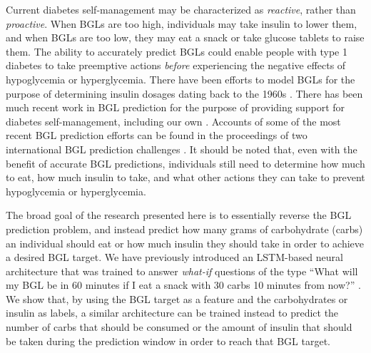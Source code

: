 \documentclass[graybox]{svmult}
\begin{document}
Current diabetes self-management may be characterized as \emph{reactive}, rather than \emph{proactive}.  When BGLs are too high, individuals may take insulin to lower them, and when BGLs are too low, they may eat a snack or take glucose tablets to raise them.  The ability to accurately predict BGLs could enable people with type 1 diabetes to take preemptive actions \emph{before} experiencing the negative effects of hypoglycemia or hyperglycemia.  There have been efforts to model BGLs for the purpose of determining insulin dosages dating back to the 1960s \cite{boutayeb2016}.  There has been much recent work in BGL prediction for the purpose of providing support for diabetes self-management, including our own \cite{bunescu:icmla13,plis:maiha14}.  Accounts of some of the most recent BGL prediction efforts can be found in the proceedings of two international BGL prediction challenges \cite{kdh-2018-proceedings,kdh-2020-proceedings}.  It should be noted that, even with the benefit of accurate BGL predictions, individuals still need to determine how much to eat, how much insulin to take, and what other actions they can take to prevent hypoglycemia or hyperglycemia.


The broad goal of the research presented here is to essentially reverse the BGL prediction problem, and instead predict how many grams of carbohydrate (carbs) an individual should eat or how much insulin they should take in order to achieve a desired BGL target. We have previously introduced an LSTM-based neural architecture that was trained to answer {\it what-if} questions of the type “What will my BGL be in 60 minutes if I eat a snack with 30 carbs 10 minutes from now?” \cite{mirshekarian:embc19}. We show that, by using the BGL target as a feature and the carbohydrates or insulin as labels, a similar architecture can be trained instead to predict the number of carbs that should be consumed or the amount of insulin that should be taken during the prediction window in order to reach that BGL target.
\end{document}
